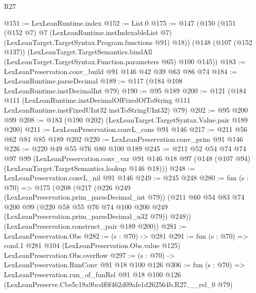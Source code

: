 \begin{lexlean}{R27}
\begin{coremodule}
@151 := LexLeanRuntime.index
@152 := List.{0}
@175 := @147
    (@150
      (@151
        (@152 @7)
        @7
        (LexLeanRuntime.instIndexableList @7)
        (LexLeanTarget.TargetSyntax.Program.functions @91)
        @18))
    (@148
      (@107 (@152 @137))
      (LexLeanTarget.TargetSemantics.bindAll
        (LexLeanTarget.TargetSyntax.Function.parameters @65)
        @100
        @145))
@183 := LexLeanPreservation.conv_build @91 @146 @42 @39 @63 @86 @74
@184 := LexLeanRuntime.parseDecimal
@189 := @117 (@184 @108 LexLeanRuntime.instDecimalInt @79)
@190 := @95 @189
@200 := @121
    (@184
      @111
      (LexLeanRuntime.instDecimalOfFixedOfToString
        @111
        LexLeanRuntime.instFixedUInt32
        instToStringUInt32)
      @79)
@202 := @95 @200 @99
@208 := @183 (@190 @202) (LexLeanTarget.TargetSyntax.Value.pair @189 @200)
@211 := LexLeanPreservation.convL_cons @91 @146
@217 := @211 @56 @62 @81 @85 @189 @202
@220 := LexLeanPreservation.conv_prim @91 @146
@226 := @220 @49 @55 @76 @80 @100 @189
@245 := @211
    @52
    @54
    @74
    @74
    @97
    @99
    (LexLeanPreservation.conv_var
      @91
      @146
      @18
      @97
      (@148 (@107 @94) (LexLeanTarget.TargetSemantics.lookup @146 @18)))
@248 := LexLeanPreservation.convL_nil @91 @146
@249 := @245 @248
@280 := fun (s : @70) =>
  @175
    (@208
      (@217
        (@226 @249 (LexLeanPreservation.prim_parseDecimal_int @79))
        (@211
          @60
          @54
          @83
          @74
          @200
          @99
          (@220 @58 @55 @76 @74 @100 @200 @249 (LexLeanPreservation.prim_parseDecimal_u32 @79))
          @248))
      (LexLeanPreservation.construct_pair @189 @200))
@281 := LexLeanPreservation.Obs
@282 := (s : @70) -> @281
@291 := fun (s : @70) =>
  cond.{1} @281 @104 (LexLeanPreservation.Obs.value @125) LexLeanPreservation.Obs.overflow
@297 := (s : @70) -> LexLeanPreservation.RunConv @91 @18 @100 @126
@306 := fun (s : @70) =>
  LexLeanPreservation.run_of_funRel
    @91
    @18
    @100
    @126
    (LexLeanPreserve.Cbe5c18a9bcdf0f462d09afe1d262564b.R27.__rel_0 @79)
\end{coremodule}
\end{lexlean}
